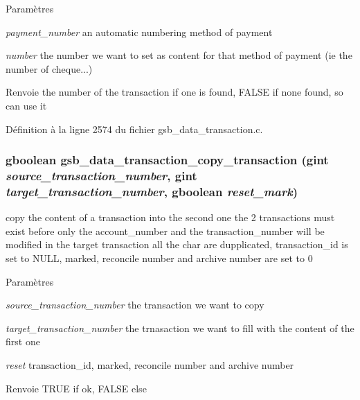 \begin{DoxyParams}{Paramètres}
\item[{\em payment\_\-number}]an automatic numbering method of payment \item[{\em number}]the number we want to set as content for that method of payment (ie the number of cheque...)\end{DoxyParams}
\begin{DoxyReturn}{Renvoie}
the number of the transaction if one is found, FALSE if none found, so can use it 
\end{DoxyReturn}


Définition à la ligne 2574 du fichier gsb\_\-data\_\-transaction.c.

\subsubsection[{gsb\_\-data\_\-transaction\_\-copy\_\-transaction}]{\setlength{\rightskip}{0pt plus 5cm}gboolean gsb\_\-data\_\-transaction\_\-copy\_\-transaction (gint {\em source\_\-transaction\_\-number}, \/  gint {\em target\_\-transaction\_\-number}, \/  gboolean {\em reset\_\-mark})}\label{gsb__data__transaction_8c_a62c650817612964ece479ede76beb9f3}
copy the content of a transaction into the second one the 2 transactions must exist before only the account\_\-number and the transaction\_\-number will be modified in the target transaction all the char are dupplicated, transaction\_\-id is set to NULL, marked, reconcile number and archive number are set to 0


\begin{DoxyParams}{Paramètres}
\item[{\em source\_\-transaction\_\-number}]the transaction we want to copy \item[{\em target\_\-transaction\_\-number}]the trnasaction we want to fill with the content of the first one \item[{\em reset}]transaction\_\-id, marked, reconcile number and archive number\end{DoxyParams}
\begin{DoxyReturn}{Renvoie}
TRUE if ok, FALSE else 
\end{DoxyReturn}



